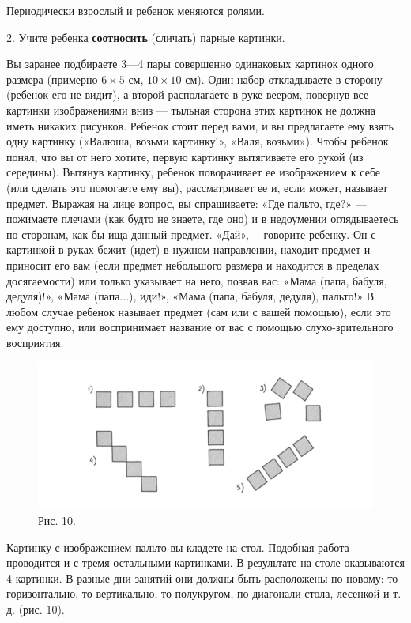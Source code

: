 \documentclass[a5paper]{book}
\begin{document}
Периодически взрослый и ребенок меняются ролями.

2. Учите ребенка \textbf{соотносить} (сличать) парные картинки.

Вы заранее подбираете 3---4 пары совершенно одинаковых картинок одного
размера (примерно $6 \times 5$ см, $10 \times 10$ см). Один набор откладываете в сторону
(ребенок его не видит), а второй располагаете в руке веером, повернув
все картинки изображениями вниз --- тыльная сторона этих картинок не
должна иметь никаких рисунков. Ребенок стоит перед вами, и вы
предлагаете ему взять одну картинку («Валюша, возьми картинку!», «Валя,
возьми»). Чтобы ребенок понял, что вы от него хотите, первую картинку
вытягиваете его рукой (из середины). Вытянув картинку, ребенок
поворачивает ее изображением к себе (или сделать это помогаете ему вы),
рассматривает ее и, если может, называет предмет. Выражая на лице
вопрос, вы спрашиваете: «Где пальто, где?» --- пожимаете плечами (как
будто не знаете, где оно) и в недоумении оглядываетесь по сторонам, как
бы ища данный предмет. «Дай»,--- говорите ребенку. Он с картинкой в
руках бежит (идет) в нужном направлении, находит предмет и приносит его
вам (если предмет небольшого размера и находится в пределах
досягаемости) или только указывает на него, позвав вас: «Мама (папа,
бабуля, дедуля)!», «Мама (папа...), иди!», «Мама (папа, бабуля, дедуля),
пальто!» В любом случае ребенок называет предмет (сам или с вашей
помощью), если это ему доступно, или воспринимает название от вас с
помощью слухо-зрительного восприятия.

\begin{figure}
\centering
\includegraphics[width=\linewidth]{media/media/image10.png}
\caption*{Рис. 10.}
\end{figure}

Картинку с изображением пальто вы кладете на стол. Подобная работа
проводится и с тремя остальными картинками. В результате на столе
оказываются 4 картинки. В разные дни занятий они должны быть расположены
по-новому: то горизонтально, то вертикально, то полукругом, по диагонали
стола, лесенкой и т. д. (рис. 10).
\end{document}
